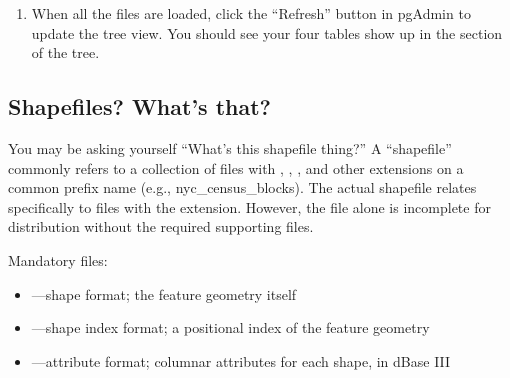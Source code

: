 \documentclass[a4paper,11pt,english]{sphinxmanual}
\begin{document}
\begin{enumerate}
\begin{itemize}
\item {} 

\item {} 

\item {} 

\end{itemize}

\item {} 
When all the files are loaded, click the “Refresh” button in pgAdmin to update the tree view. You should see your four tables show up in the  section of the tree.

\noindent{}

\end{enumerate}


\subsection{Shapefiles? What’s that?}
\label{\detokenize{setup:shapefiles-what-s-that}}
You may be asking yourself \textendash{} “What’s this shapefile thing?”  A “shapefile” commonly refers to a collection of files with , , , and other extensions on a common prefix name (e.g., nyc\_census\_blocks). The actual shapefile relates specifically to files with the  extension. However, the  file alone is incomplete for distribution without the required supporting files.

Mandatory files:
\begin{itemize}
\item {} 
—shape format; the feature geometry itself

\item {} 
—shape index format; a positional index of the feature geometry

\item {} 
—attribute format; columnar attributes for each shape, in dBase III

\end{itemize}
\end{document}
